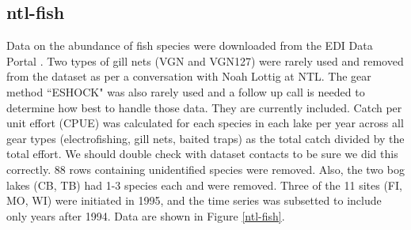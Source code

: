 \documentclass[11pt, oneside]{article}
\begin{document}


\subsection {ntl-fish}

Data on the abundance of fish species were downloaded from the EDI Data Portal \citep{ntl-fish}.
Two types of gill nets (VGN and VGN127) were rarely used and removed from the dataset as per a conversation with Noah Lottig at NTL.
The gear method ``ESHOCK" was also rarely used and a follow up call is needed to determine how best to handle those data.
They are currently included.
Catch per unit effort (CPUE) was calculated for each species in each lake per year across all gear types (electrofishing, gill nets, baited traps) as the total catch divided by the total effort.
We should double check with dataset contacts to be sure we did this correctly.
88 rows containing unidentified species were removed.
Also, the two bog lakes (CB, TB) had 1-3 species each and were removed. 
Three of the 11 sites (FI, MO, WI) were initiated in 1995, and the time series was subsetted to include only years after 1994.
Data are shown in Figure \ref{ntl-fish}.
\end{document}
